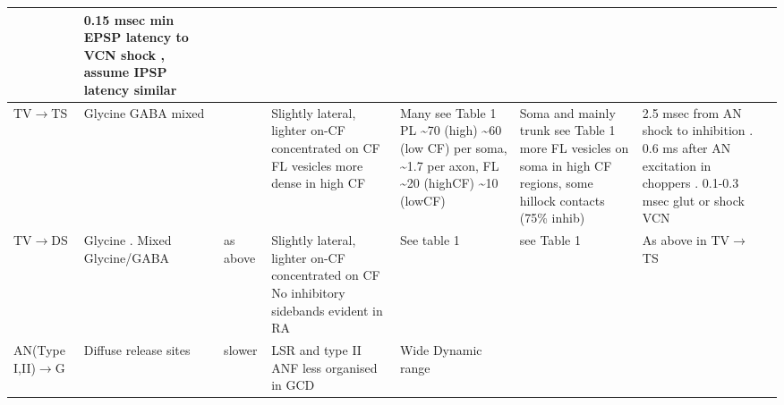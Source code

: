 \begin{longtable}{XXXXXXXX}
& 
0.15 msec min EPSP latency to VCN shock , assume IPSP latency similar
\citep{ZhangOertel:1993}\\ \midrule
TV\ensuremath{\rightarrow}TS                        
& %
Glycine\citep{OertelWickesberg:1993,OstapoffMorestEtAl:1999,SaintBensonEtAl:1991,WickesbergOertel:1993}
                GABA mixed \citep{OsenOttersenEtAl:1990}                  
& %
   \citep{HartyManis:1998,OertelWickesberg:1993,WickesbergOertel:1993}    
& %
Slightly lateral, lighter on-CF \citep{OstapoffMorestEtAl:1999} concentrated
on CF \citep{ZhangOertel:1993} FL vesicles more dense in high CF
                      \citep{JosephsonMorest:1998}                        
& %
Many \citep{OstapoffMorestEtAl:1999} see
Table 1 \citep{SmithRhode:1989} PL \~{}70 (high) \~{}60 (low CF) per soma,
\~{}1.7 per axon, FL \~{}20 (highCF) \~{}10 (lowCF)
                      \citep{JosephsonMorest:1998}                        
& %
Soma and mainly trunk
\citep{AltschulerJuizEtAl:1993} 
see Table 1\citep{SmithRhode:1989} 
more FL vesicles on soma in high CF regions, some hillock contacts (75\% inhib) \citep{JosephsonMorest:1998}                        
& %
2.5 msec from AN shock to inhibition \citep{WickesbergOertel:1993}. 
0.6 ms after AN excitation in choppers \citep{Wickesberg:1996}. 
0.1-0.3 msec glut or shock VCN \citep{ZhangOertel:1993}
\\ \midrule
TV\ensuremath{\rightarrow}DS                        
&  %
Glycine \citep{OstapoffMorestEtAl:1999,SaintBensonEtAl:1991}. 
Mixed  Glycine/GABA \citep{OsenOttersenEtAl:1990}                 
& %
\citep{OstapoffMorestEtAl:1999}
                                as above                                  
& Slightly lateral, lighter on-CF \citep{OstapoffMorestEtAl:1999}
concentrated on CF \citep{ZhangOertel:1993} No inhibitory sidebands evident in RA                                   
&    See table 1 \citep{SmithRhode:1989}     
& see Table 1 \citep{SmithRhode:1989}                          
& 
As above in TV\ensuremath{\rightarrow}TS
\\ \midrule
AN(Type I,II)\ensuremath{\rightarrow}G                      
& %
\citep{Cant:1992,FerragamoGoldingEtAl:1998a,RyugoWrightEtAl:1993,Ryugo:1992,RyugoParks:2003}
Diffuse release sites \citep{HurdHutsonEtAl:1999}             
& %
   \citep{GardnerTrussellEtAl:1999} slower \citep{HurdHutsonEtAl:1999}    
& %
LSR and type II ANF less organised in GCD \citep{WeedmanPongstapornEtAl:1996,RyugoWrigthEtAl:1993}
& %
Wide Dynamic range \citep{GhoshalKim:1997} 

\end{longtable}
